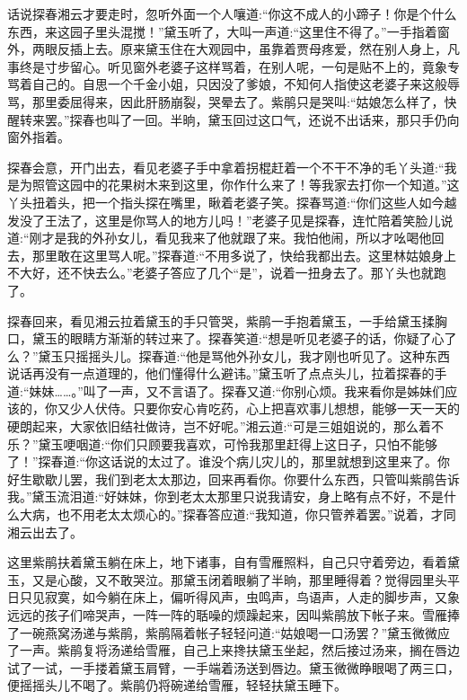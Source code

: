 


\begin{parag}
    话说探春湘云才要走时，忽听外面一个人嚷道:“你这不成人的小蹄子！你是个什么东西，来这园子里头混搅！”黛玉听了，大叫一声道:“这里住不得了。”一手指着窗外，两眼反插上去。原来黛玉住在大观园中，虽靠着贾母疼爱，然在别人身上，凡事终是寸步留心。听见窗外老婆子这样骂着，在别人呢，一句是贴不上的，竟象专骂着自己的。自思一个千金小姐，只因没了爹娘，不知何人指使这老婆子来这般辱骂，那里委屈得来，因此肝肠崩裂，哭晕去了。紫鹃只是哭叫:“姑娘怎么样了，快醒转来罢。”探春也叫了一回。半晌，黛玉回过这口气，还说不出话来，那只手仍向窗外指着。
\end{parag}


\begin{parag}
    探春会意，开门出去，看见老婆子手中拿着拐棍赶着一个不干不净的毛丫头道:“我是为照管这园中的花果树木来到这里，你作什么来了！等我家去打你一个知道。”这丫头扭着头，把一个指头探在嘴里，瞅着老婆子笑。探春骂道:“你们这些人如今越发没了王法了，这里是你骂人的地方儿吗！”老婆子见是探春，连忙陪着笑脸儿说道:“刚才是我的外孙女儿，看见我来了他就跟了来。我怕他闹，所以才吆喝他回去，那里敢在这里骂人呢。”探春道:“不用多说了，快给我都出去。这里林姑娘身上不大好，还不快去么。”老婆子答应了几个“是”，说着一扭身去了。那丫头也就跑了。
\end{parag}


\begin{parag}
    探春回来，看见湘云拉着黛玉的手只管哭，紫鹃一手抱着黛玉，一手给黛玉揉胸口，黛玉的眼睛方渐渐的转过来了。探春笑道:“想是听见老婆子的话，你疑了心了么？”黛玉只摇摇头儿。探春道:“他是骂他外孙女儿，我才刚也听见了。这种东西说话再没有一点道理的，他们懂得什么避讳。”黛玉听了点点头儿，拉着探春的手道:“妹妹……。”叫了一声，又不言语了。探春又道:“你别心烦。我来看你是姊妹们应该的，你又少人伏侍。只要你安心肯吃药，心上把喜欢事儿想想，能够一天一天的硬朗起来，大家依旧结社做诗，岂不好呢。”湘云道:“可是三姐姐说的，那么着不乐？”黛玉哽咽道:“你们只顾要我喜欢，可怜我那里赶得上这日子，只怕不能够了！”探春道:“你这话说的太过了。谁没个病儿灾儿的，那里就想到这里来了。你好生歇歇儿罢，我们到老太太那边，回来再看你。你要什么东西，只管叫紫鹃告诉我。”黛玉流泪道:“好妹妹，你到老太太那里只说我请安，身上略有点不好，不是什么大病，也不用老太太烦心的。”探春答应道:“我知道，你只管养着罢。”说着，才同湘云出去了。
\end{parag}


\begin{parag}
    这里紫鹃扶着黛玉躺在床上，地下诸事，自有雪雁照料，自己只守着旁边，看着黛玉，又是心酸，又不敢哭泣。那黛玉闭着眼躺了半晌，那里睡得着？觉得园里头平日只见寂寞，如今躺在床上，偏听得风声，虫鸣声，鸟语声，人走的脚步声，又象远远的孩子们啼哭声，一阵一阵的聒噪的烦躁起来，因叫紫鹃放下帐子来。雪雁捧了一碗燕窝汤递与紫鹃，紫鹃隔着帐子轻轻问道:“姑娘喝一口汤罢？”黛玉微微应了一声。紫鹃复将汤递给雪雁，自己上来搀扶黛玉坐起，然后接过汤来，搁在唇边试了一试，一手搂着黛玉肩臂，一手端着汤送到唇边。黛玉微微睁眼喝了两三口，便摇摇头儿不喝了。紫鹃仍将碗递给雪雁，轻轻扶黛玉睡下。
\end{parag}


